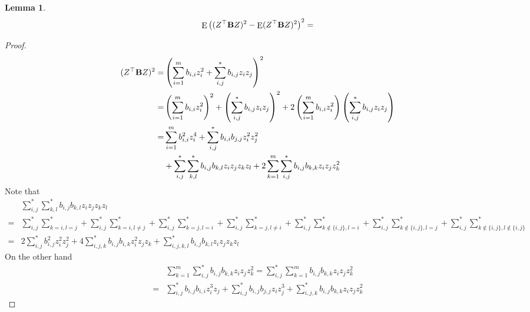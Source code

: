 \documentclass[11pt]{article}
\DeclareMathOperator{\myE}{E}
\theoremstyle{plain}
\newtheorem{lemma}{\quad\quad Lemma}
\theoremstyle{definition}
\theoremstyle{remark}
\begin{document}
\begin{lemma}
\begin{equation*}
    \myE \left((Z^\top \BB Z)^2-\myE (Z^\top \BB Z)^2\right)^2=
\end{equation*}
\end{lemma}
\begin{proof}
\begin{equation*}
    \begin{split}
    (Z^\top \mathbf{B} Z)^2
    =&
    \left(\sum_{i=1}^m b_{i,i}z_{i}^2 + \sum_{i,j}^* b_{i,j} z_i z_j\right)^2
    \\
    =&
    \left(\sum_{i=1}^m b_{i,i}z_{i}^2 \right)^2 + \left(\sum_{i,j}^* b_{i,j} z_i z_j\right)^2
    +
    2\left(\sum_{i=1}^m b_{i,i}z_{i}^2 \right)\left(\sum_{i,j}^* b_{i,j} z_i z_j\right)
    \\
    =&
    \sum_{i=1}^m b_{i,i}^2 z_{i}^4
    +\sum_{i,j}^* b_{i,i} b_{j,j} z_i^2 z_j^2
    \\
    &+ 
    \sum_{i,j}^* \sum_{k,l}^* b_{i,j} b_{k,l} z_i z_j z_k z_l
    +
    2
    \sum_{k=1}^m \sum_{i,j}^* b_{i,j} b_{k,k} z_i z_j z_{k}^2 
    \end{split}
\end{equation*}
Note that
\begin{equation*}
    \begin{split}
    &\sum_{i,j}^* \sum_{k,l}^*
    b_{i,j} b_{k,l} z_i z_j z_k z_l
    \\
    =&
    \sum_{i,j}^*
    \sum_{k=i,l=j}^*
    +
    \sum_{i,j}^*
    \sum_{k=i,l\neq j}^*
    +
    \sum_{i,j}^*
    \sum_{k=j,l=i}^*
    +
    \sum_{i,j}^*
    \sum_{k=j,l\neq i}^*
    +
    \sum_{i,j}^*
    \sum_{k\notin \{i,j\},l=i}^*
    +
    \sum_{i,j}^*
    \sum_{k\notin \{i,j\},l=j}^*
    +
    \sum_{i,j}^*
    \sum_{k\notin \{i,j\},l\notin \{i,j\}}^*
    \\
    =&
    2\sum_{i,j}^* b_{i,j}^2 z_i^2 z_j^2
    +4\sum_{i,j,k}^* b_{i,j} b_{i,k} z_i^2 z_j z_k
    +
    \sum_{i,j,k,l}^*
    b_{i,j} b_{k,l} z_i z_j z_k z_l
    \end{split}
\end{equation*}
On the other hand
\begin{equation*}
\begin{split}
    &\sum_{k=1}^m \sum_{i,j}^* b_{i,j} b_{k,k} z_i z_j z_{k}^2 
    =
     \sum_{i,j}^* \sum_{k=1}^m b_{i,j} b_{k,k} z_i z_j z_{k}^2 
    \\
    =
    &
     \sum_{i,j}^* b_{i,j} b_{i,i} z_i^3 z_j  
     +
     \sum_{i,j}^* b_{i,j} b_{j,j} z_i z_j^3
     +
     \sum_{i,j,k}^* b_{i,j} b_{k,k} z_{i} z_j z_k^2

\end{split}
\end{equation*}
\end{proof}
\end{document}
